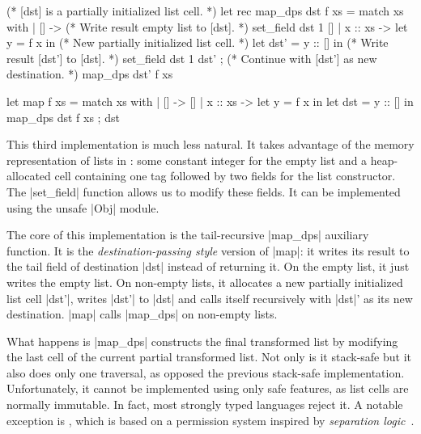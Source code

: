 \begin{minipage}{0.65\linewidth}
\begin{OCaml}
(* [dst] is a partially initialized list cell. *)
let rec map_dps dst f xs =
  match xs with
  | [] ->
      (* Write result empty list to [dst]. *)
      set_field dst 1 []
  | x :: xs ->
      let y = f x in
      (* New partially initialized list cell. *)
      let dst' = y :: [] in
      (* Write result [dst'] to [dst]. *)
      set_field dst 1 dst' ;
      (* Continue with [dst'] as new destination. *)
      map_dps dst' f xs
\end{OCaml}
\end{minipage}
\hfill
\begin{minipage}{0.45\linewidth}
\begin{OCaml}
let map f xs =
  match xs with
  | [] ->
      []
  | x :: xs ->
      let y = f x in
      let dst = y :: [] in
      map_dps dst f xs ;
      dst
\end{OCaml}
\end{minipage}

This third implementation is much less natural.
%
It takes advantage of the memory representation of lists in \OCamlLang: some constant integer for the empty list and a heap-allocated cell containing one tag followed by two fields for the list constructor.
%
The \ocaml|set_field| function allows us to modify these fields.
%
It can be implemented using the unsafe \ocaml|Obj| module.

The core of this implementation is the tail-recursive \ocaml|map_dps| auxiliary function.
%
It is the \emph{destination-passing style} version of \ocaml|map|: it writes its result to the tail field of destination \ocaml|dst| instead of returning it.
%
On the empty list, it just writes the empty list.
%
On non-empty lists, it allocates a new partially initialized list cell \ocaml|dst'|, writes \ocaml|dst'| to \ocaml|dst| and calls itself recursively with \ocaml|dst|' as its new destination.
%
\ocaml|map| calls \ocaml|map_dps| on non-empty lists.

What happens is \ocaml|map_dps| constructs the final transformed list by modifying the last cell of the current partial transformed list.
%
Not only is it stack-safe but it also does only one traversal, as opposed the previous stack-safe implementation.
%
Unfortunately, it cannot be implemented using only safe \OCamlLang features, as list cells are normally immutable.
%
In fact, most strongly typed languages reject it.
%
A notable exception is \MezzoLang \cite{DBLP:journals/toplas/BalabonskiPP16}, which is based on a permission system inspired by \emph{separation logic}~\cite{DBLP:journals/cacm/OHearn19}.

